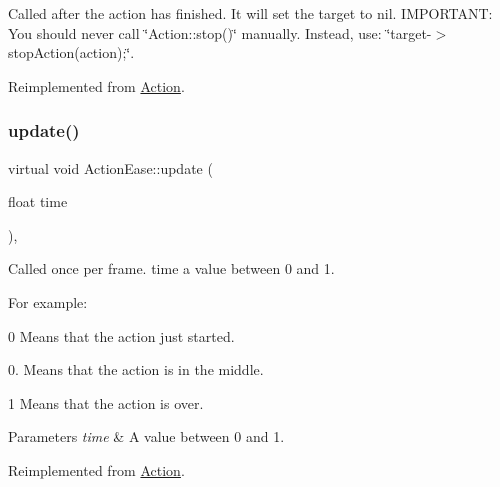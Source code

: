 Called after the action has finished. It will set the \textquotesingle{}target\textquotesingle{} to nil. I\+M\+P\+O\+R\+T\+A\+NT\+: You should never call \char`\"{}\+Action\+::stop()\char`\"{} manually. Instead, use\+: \char`\"{}target-\/$>$stop\+Action(action);\char`\"{}. 

Reimplemented from \hyperlink{classAction_a968267fa7a1dcc46a2976249a712d3c8}{Action}.

\mbox{\label{classActionEase_afaef2afc55ebf4e8d6897c3cb1977c1e}} 
\subsubsection{\texorpdfstring{update()}{update()}\hspace{0.1cm}{\footnotesize\ttfamily [1/2]}}
{\footnotesize\ttfamily virtual void Action\+Ease\+::update (\begin{DoxyParamCaption}\item[{float}]{time }\end{DoxyParamCaption})\hspace{0.3cm}{\ttfamily [override]}, {\ttfamily [virtual]}}

Called once per frame. time a value between 0 and 1.

For example\+:
\begin{DoxyItemize}
\item 0 Means that the action just started.
\item 0. Means that the action is in the middle.
\item 1 Means that the action is over.
\end{DoxyItemize}


\begin{DoxyParams}{Parameters}
{\em time} & A value between 0 and 1. \\
\hline
\end{DoxyParams}


Reimplemented from \hyperlink{classAction_a937e646e63915e33ad05ba149bfcf239}{Action}.



